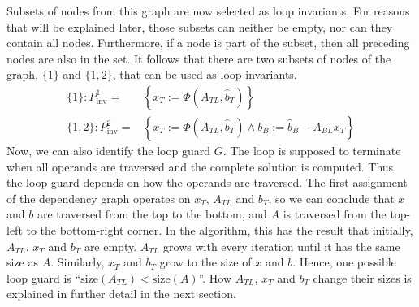 Subsets of nodes from this graph are now selected as loop invariants. For reasons that will be explained later, those subsets can neither be empty, nor can they contain all nodes. Furthermore, if a node is part of the subset, then all preceding nodes are also in the set. It follows that there are two subsets of nodes of the graph, $\{1\}$ and $\{1, 2\}$, that can be used as loop invariants. 
%
%
\begin{align*}
\{1\}: P_\text{inv}^{1} = &\left\{ x_T := \Phi \left( A_{TL}, \hat{b}_T \right) \right\} \\
\{1, 2\}: P_\text{inv}^{2} = &\left\{ x_T := \Phi \left( A_{TL}, \hat{b}_T \right) \land b_B := \hat{b}_B - A_{BL} x_T \right\}
\end{align*}
%
%
Now, we can also identify the loop guard $G$. The loop is supposed to terminate when all operands are traversed and the complete solution is computed. Thus, the loop guard depends on how the operands are traversed. The first assignment of the dependency graph operates on $x_T$, $A_{TL}$ and $b_T$, so we can conclude that $x$ and $b$ are traversed from the top to the bottom, and $A$ is traversed from the top-left to the bottom-right corner. In the algorithm, this has the result that initially, $A_{TL}$, $x_T$ and $b_T$ are empty. $A_{TL}$ grows with every iteration until it has the same size as $A$. Similarly, $x_T$ and $b_T$ grow to the size of $x$ and $b$. Hence, one possible loop guard is ``$\text{size}(A_{TL}) < \text{size}(A)$''. How $A_{TL}$, $x_T$ and $b_T$ change their sizes is explained in further detail in the next section.

